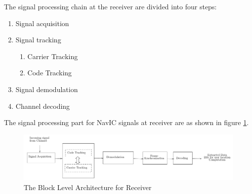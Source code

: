 
The signal processing chain at the receiver are divided into four steps:
\begin{enumerate}
	\item Signal acquisition
	\item Signal tracking
	\begin{enumerate}
		\item Carrier Tracking
		\item Code Tracking
	\end{enumerate}
	\item Signal demodulation
	\item Channel decoding
\end{enumerate}
The signal processing part for NavIC signals at receiver are as shown in figure \ref{fig:demod_flow}.
\begin{normalsize}
	\begin{figure}[ht]
		\centering
		\includegraphics[width=1\columnwidth]{figs/receiver_block}
		\centering
		\captionsetup{justification=centering}
		\caption{The Block Level Architecture for Receiver}
		\label{fig:demod_flow}
	\end{figure}
\end{normalsize}
\\
\\
